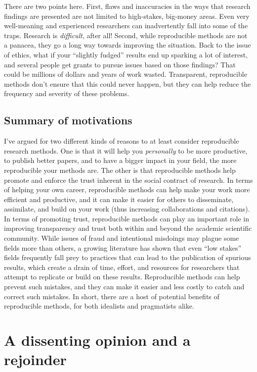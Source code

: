 \documentclass{book}
\begin{document}
There are two points here. First, flaws and inaccuracies in the ways that research findings are presented are not limited to high-stakes, big-money areas. Even very well-meaning and experienced researchers can inadvertently fall into some of the traps. Research is \emph{difficult}, after all!  Second, while reproducible methods are not a panacea, they go a long way towards improving the situation. Back to the issue of ethics, what if your ``slightly fudged'' results end up sparking a lot of interest, and several people get grants to pursue issues based on those findings? That could be millions of dollars and years of work wasted.  Transparent, reproducible methods don't ensure that this could never happen, but they can help reduce the frequency and severity of these problems.
\subsection{Summary of motivations}
\label{sec-2-3-3}

I've argued for two different kinds of reasons to at least consider reproducible research methods. One is that it will help you \emph{personally} to be more productive, to publish better papers, and to have a bigger impact in your field, the more reproducible your methods are. The other is that reproducible methods help promote and enforce the trust inherent in the social contract of research.  In terms of helping your own career, reproducible methods can help make your work more efficient and productive, and it can make it easier for others to disseminate, assimilate, and build on your work (thus increasing collaborations and citations).  In terms of promoting trust, reproducible methods can play an important role in improving transparency and trust both within and beyond the academic scientific community.  While issues of fraud and intentional misdoings may plague some fields more than others, a growing literature has shown that even ``low stakes'' fields frequently fall prey to practices that can lead to the publication of spurious results, which create a drain of time, effort, and resources for researchers that attempt to replicate or build on these results. Reproducible methods can help prevent such mistakes, and they can make it easier and less costly to catch and correct such mistakes.  In short, there are a host of potential benefits of reproducible methods, for both idealists and pragmatists alike.
\section{A dissenting opinion and a rejoinder}
\label{sec-2-4}
\label{dissenting}
\end{document}
